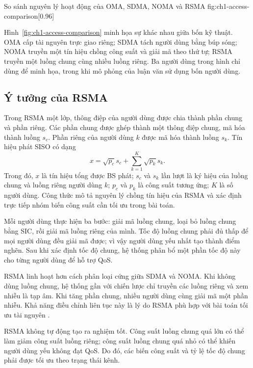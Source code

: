 {So sánh nguyên lý hoạt động của OMA, SDMA, NOMA và RSMA}
{fig:ch1-access-comparison}[0.96\linewidth]

Hình~\ref{fig:ch1-access-comparison} minh họa sự khác nhau giữa bốn kỹ thuật. OMA cấp tài nguyên trực giao riêng; SDMA tách người dùng bằng búp sóng; NOMA truyền một tín hiệu chồng công suất và giải mã theo thứ tự; RSMA truyền một luồng chung cùng nhiều luồng riêng. Ba người dùng trong hình chỉ dùng để minh họa, trong khi mô phỏng của luận văn sử dụng bốn người dùng.

\subsection{Ý tưởng của RSMA}
Trong RSMA một lớp, thông điệp của người dùng được chia thành phần chung và phần riêng. Các phần chung được ghép thành một thông điệp chung, mã hóa thành luồng $s_c$. Phần riêng của người dùng $k$ được mã hóa thành luồng $s_k$. Tín hiệu phát SISO có dạng
\begin{equation}
 x=\sqrt{p_c}s_c+\sum_{k=1}^{K}\sqrt{p_k}s_k.
 \label{eq:ch1-rsma-signal}
\end{equation}
Trong đó, $x$ là tín hiệu tổng được BS phát; $s_c$ và $s_k$ lần lượt là ký hiệu của luồng chung và luồng riêng người dùng $k$; $p_c$ và $p_k$ là công suất tương ứng; $K$ là số người dùng. Công thức mô tả nguyên lý chồng tín hiệu của RSMA và xác định trực tiếp nhóm biến công suất cần tối ưu trong bài toán.

Mỗi người dùng thực hiện ba bước: giải mã luồng chung, loại bỏ luồng chung bằng SIC, rồi giải mã luồng riêng của mình. Tốc độ luồng chung phải đủ thấp để mọi người dùng đều giải mã được; vì vậy người dùng yếu nhất tạo thành điểm nghẽn. Sau khi xác định tốc độ chung, hệ thống phân bổ một phần tốc độ này cho từng người dùng để hỗ trợ QoS.

RSMA linh hoạt hơn cách phân loại cứng giữa SDMA và NOMA. Khi không dùng luồng chung, hệ thống gần với chiến lược chỉ truyền các luồng riêng và xem nhiễu là tạp âm. Khi tăng phần chung, nhiều người dùng cùng giải mã một phần nhiễu. Khả năng điều chỉnh liên tục này là lý do RSMA phù hợp với bài toán tối ưu tài nguyên \cite{Mao2018RSMABridging,Mao2022RSMAFundamentals}.

RSMA không tự động tạo ra nghiệm tốt. Công suất luồng chung quá lớn có thể làm giảm công suất luồng riêng; công suất luồng chung quá nhỏ có thể khiến người dùng yếu không đạt QoS. Do đó, các biến công suất và tỷ lệ tốc độ chung phải được tối ưu theo trạng thái kênh.

